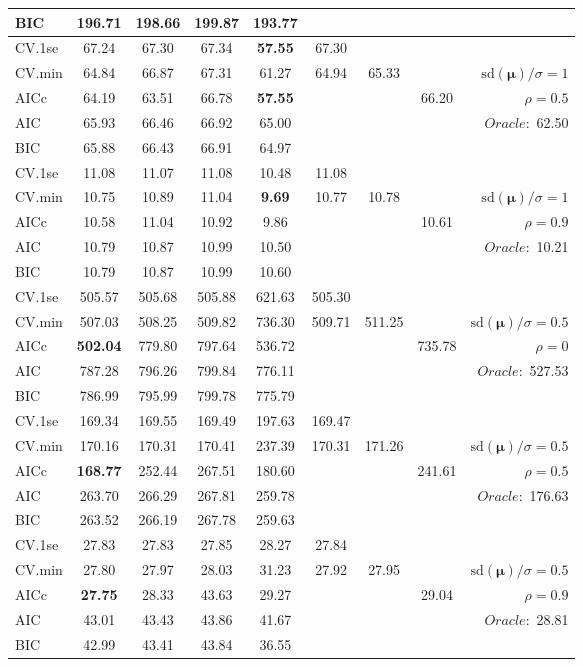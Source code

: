 \begin{table}
\begin{center}
\begin{tabular}{l*{7}{c}|r}
BIC & 196.71 & 198.66 & 199.87 & 193.77 & & & &  \\
 \hline 
CV.1se & 67.24 & 67.30 & 67.34 & {\bf 57.55} & 67.30 & & & \\
CV.min & 64.84 & 66.87 & 67.31 & 61.27 & 64.94 & 65.33 & & $\mathrm{sd}(\mathbf{\mu})/\sigma=1$ \\
AICc & 64.19 & 63.51 & 66.78 & {\bf 57.55} & & & 66.20 &  $\rho=0.5$ \\
AIC & 65.93 & 66.46 & 66.92 & 65.00 & & & &  \multirow{2}{*}{$Oracle: $ 62.50} \\
BIC & 65.88 & 66.43 & 66.91 & 64.97 & & & &  \\
 \hline 
CV.1se & 11.08 & 11.07 & 11.08 & 10.48 & 11.08 & & & \\
CV.min & 10.75 & 10.89 & 11.04 & {\bf 9.69} & 10.77 & 10.78 & & $\mathrm{sd}(\mathbf{\mu})/\sigma=1$ \\
AICc & 10.58 & 11.04 & 10.92 & 9.86 & & & 10.61 &  $\rho=0.9$ \\
AIC & 10.79 & 10.87 & 10.99 & 10.50 & & & &  \multirow{2}{*}{$Oracle: $ 10.21} \\
BIC & 10.79 & 10.87 & 10.99 & 10.60 & & & &  \\
 \hline 
CV.1se & 505.57 & 505.68 & 505.88 & 621.63 & 505.30 & & & \\
CV.min & 507.03 & 508.25 & 509.82 & 736.30 & 509.71 & 511.25 & & $\mathrm{sd}(\mathbf{\mu})/\sigma=0.5$ \\
AICc & {\bf 502.04} & 779.80 & 797.64 & 536.72 & & & 735.78 &  $\rho=0$ \\
AIC & 787.28 & 796.26 & 799.84 & 776.11 & & & &  \multirow{2}{*}{$Oracle: $ 527.53} \\
BIC & 786.99 & 795.99 & 799.78 & 775.79 & & & &  \\
 \hline 
CV.1se & 169.34 & 169.55 & 169.49 & 197.63 & 169.47 & & & \\
CV.min & 170.16 & 170.31 & 170.41 & 237.39 & 170.31 & 171.26 & & $\mathrm{sd}(\mathbf{\mu})/\sigma=0.5$ \\
AICc & {\bf 168.77} & 252.44 & 267.51 & 180.60 & & & 241.61 &  $\rho=0.5$ \\
AIC & 263.70 & 266.29 & 267.81 & 259.78 & & & &  \multirow{2}{*}{$Oracle: $ 176.63} \\
BIC & 263.52 & 266.19 & 267.78 & 259.63 & & & &  \\
 \hline 
CV.1se & 27.83 & 27.83 & 27.85 & 28.27 & 27.84 & & & \\
CV.min & 27.80 & 27.97 & 28.03 & 31.23 & 27.92 & 27.95 & & $\mathrm{sd}(\mathbf{\mu})/\sigma=0.5$ \\
AICc & {\bf 27.75} & 28.33 & 43.63 & 29.27 & & & 29.04 &  $\rho=0.9$ \\
AIC & 43.01 & 43.43 & 43.86 & 41.67 & & & &  \multirow{2}{*}{$Oracle: $ 28.81} \\
BIC & 42.99 & 43.41 & 43.84 & 36.55 & & & &  \\
 \hline 
\end{tabular}
\end{center}
\vspace{-1cm}
\end{table}





